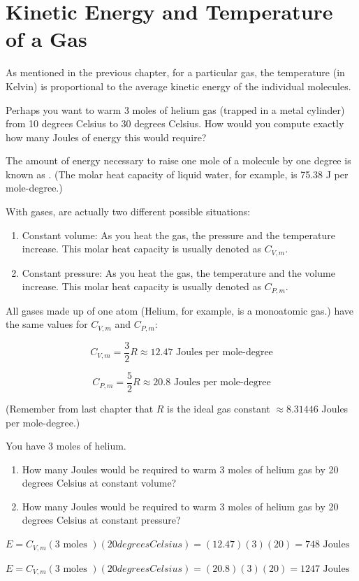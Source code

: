 \chapter{Kinetic Energy and Temperature of a Gas}

As mentioned in the previous chapter,   for a particular gas,  the temperature (in Kelvin) is proportional to the average kinetic energy of the individual molecules. 

Perhaps you want to warm 3 moles of helium gas (trapped in a metal cylinder) from 10 degrees Celsius to 30 degrees Celsius.   
How would you compute exactly how many Joules of energy this would require?

The amount of energy necessary to raise one mole of a molecule by one degree is known as .  
(The molar heat capacity of liquid water, for example, is 75.38 J per mole-degree.)

With gases, are actually two different possible situations:
\begin{enumerate}
\item Constant volume: As you heat the gas,  the pressure and the temperature increase.  This molar heat capacity is usually denoted as $C_{V,m}$.
\item Constant pressure: As you heat the gas,  the temperature and the volume increase.  This molar heat capacity  is usually denoted as $C_{P, m}$.
\end{enumerate}

All gases made up of one atom (Helium, for example, is a monoatomic gas.) have the same values for $C_{V,m}$ and $C_{P,m}$:

$$C_{V,m} = \frac{3}{2}R \approx 12.47 \text{ Joules per mole-degree}$$

$$C_{P,m} = \frac{5}{2}R \approx 20.8  \text{ Joules per mole-degree}$$

(Remember from last chapter that $R$ is the ideal gas constant $\approx 8.31446$ Joules per mole-degree.)

\begin{Exercise}[title={Warming Helium},  label=warming_helium]

You have 3 moles of helium.  
  
\begin{enumerate}

\item How many Joules would be required to warm 3 moles of helium gas by 20 degrees Celsius at constant volume?  

\item How many Joules would be required to warm 3 moles of helium gas by 20 degrees Celsius at constant pressure?  

\end{enumerate}


\end{Exercise}
\begin{Answer}[ref=warming_helium]

$E = C_{V,m} (3 \text{ moles }) (20 { degrees Celsius }) = (12.47)(3)(20) = 748 \text{ Joules }$

$E = C_{V,m} (3 \text{ moles }) (20 { degrees Celsius }) = (20.8)(3)(20) = 1247 \text{ Joules }$
\end{Answer}

